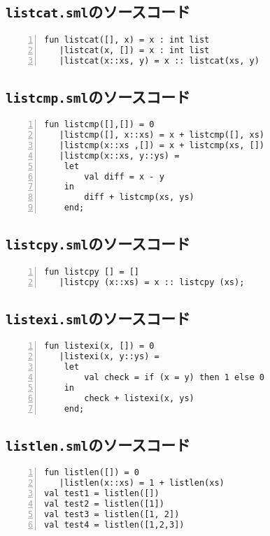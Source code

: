 \documentclass[autodetect-engine,dvi=dvipdfmx,ja=standard,
               a4j,11pt]{bxjsarticle}
\begin{document}
\subsection{\texttt{listcat.sml}のソースコード} \label{listcat_code}
\begin{Verbatim}[numbers=left, xleftmargin=8mm, numbersep=6pt,
    fontsize=\small, baselinestretch=0.8]
fun listcat([], x) = x : int list
   |listcat(x, []) = x : int list
   |listcat(x::xs, y) = x :: listcat(xs, y)
\end{Verbatim}
\subsection{\texttt{listcmp.sml}のソースコード} \label{listcmp_code}
\begin{Verbatim}[numbers=left, xleftmargin=8mm, numbersep=6pt,
    fontsize=\small, baselinestretch=0.8]
fun listcmp([],[]) = 0
   |listcmp([], x::xs) = x + listcmp([], xs)
   |listcmp(x::xs ,[]) = x + listcmp(xs, [])
   |listcmp(x::xs, y::ys) = 
    let
        val diff = x - y
    in
        diff + listcmp(xs, ys)
    end;
\end{Verbatim}
\subsection{\texttt{listcpy.sml}のソースコード} \label{listcpy_code}
\begin{Verbatim}[numbers=left, xleftmargin=8mm, numbersep=6pt,
    fontsize=\small, baselinestretch=0.8]
fun listcpy [] = []
   |listcpy (x::xs) = x :: listcpy (xs);
\end{Verbatim}
\subsection{\texttt{listexi.sml}のソースコード} \label{listexi_code}
\begin{Verbatim}[numbers=left, xleftmargin=8mm, numbersep=6pt,
    fontsize=\small, baselinestretch=0.8]
fun listexi(x, []) = 0
   |listexi(x, y::ys) = 
    let
        val check = if (x = y) then 1 else 0
    in
        check + listexi(x, ys)
    end;
\end{Verbatim}
\subsection{\texttt{listlen.sml}のソースコード} \label{listlen_code}
\begin{Verbatim}[numbers=left, xleftmargin=8mm, numbersep=6pt,
    fontsize=\small, baselinestretch=0.8]
fun listlen([]) = 0
   |listlen(x::xs) = 1 + listlen(xs)
val test1 = listlen([])
val test2 = listlen([1])
val test3 = listlen([1, 2])
val test4 = listlen([1,2,3])
\end{Verbatim}
\end{document}
